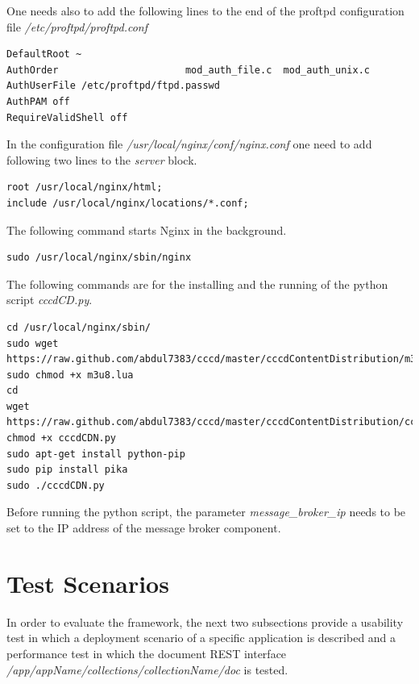 One needs also to add the following lines to the end of the proftpd configuration file \textit{/etc/proftpd/proftpd.conf}
\begin{code}
\begin{verbatim}
DefaultRoot ~
AuthOrder                      mod_auth_file.c  mod_auth_unix.c
AuthUserFile /etc/proftpd/ftpd.passwd
AuthPAM off
RequireValidShell off
\end{verbatim}
\end{code}

In the configuration file \textit{/usr/local/nginx/conf/nginx.conf} one need to add following two lines to the \textit{server} block.

\begin{code}
\begin{verbatim}
root /usr/local/nginx/html;
include /usr/local/nginx/locations/*.conf;
\end{verbatim}
\end{code}
 
The following command starts Nginx in the background.

\begin{code}
\begin{verbatim}
sudo /usr/local/nginx/sbin/nginx
\end{verbatim}
\end{code}

The following commands are for the installing and the running of the python script \textit{cccdCD.py}.

\begin{code}
\begin{verbatim}
cd /usr/local/nginx/sbin/
sudo wget https://raw.github.com/abdul7383/cccd/master/cccdContentDistribution/m3u8.lua
sudo chmod +x m3u8.lua 
cd
wget https://raw.github.com/abdul7383/cccd/master/cccdContentDistribution/cccdCDN.py
chmod +x cccdCDN.py
sudo apt-get install python-pip
sudo pip install pika
sudo ./cccdCDN.py
\end{verbatim}
\end{code}

Before running the python script, the parameter \textit{message\_broker\_ip} needs to be set to the IP address of the message broker component.

\section{Test Scenarios\label{sec:eval__te_sc}}
In order to evaluate the framework, the next two subsections provide a usability test in which a deployment scenario of a specific application is described and a performance test in which the document REST interface \textit{/app/{appName}/collections/{collectionName}/doc} is tested.

